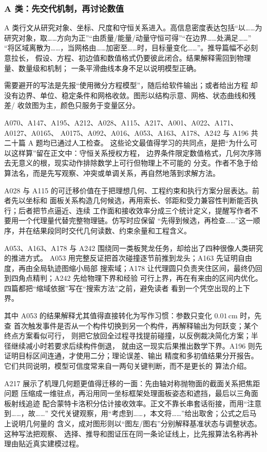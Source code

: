 \subsubsection{A 类：先交代机制，再讨论数值}

A 类行文从研究对象、坐标、尺度和守恒关系进入。高信息密度表达包括“以……为
研究对象，取……方向为正”“由质量/能量/动量守恒可得”“在边界……处满足……”
“将区域离散为……，当网格由……加密至……时，目标量变化……”。推导篇幅不必刻意拉长，
假设、方程、初边值和数值格式仍要彼此闭合。结果解释需回到物理量、数量级和机制；
一条平滑曲线本身不足以说明模型正确。

需要避开的写法是先报“使用微分方程模型”，随后给软件输出；或者给出方程
却没有边界、单位、稳定条件和网格收敛。图形以结构示意、网格、状态曲线和残差/
收敛图为主，颜色只服务于变量区分。

A070、A147、A195、A212、A028、A115、A217、A001、A022、A171、A0127、A0165、
A0175、A092、A016、A053、A163、A178、A242 与 A196 共二十篇 A 题均已通过人工检查。
这些论文最值得学习的共同点，是把“为什么可以这样算”留在正文中：守恒关系授权方程，
边界条件限定数值格式，几何次序筛去无意义的根，现实动作排除数学上可行但物理上不可能的
分支。作者不急于给算法名，而是先写观察、冲突或单调关系，再自然地落到求解方法。

A028 与 A115 的可迁移价值在于把理想几何、工程约束和执行方案分层表达。前者先以坐标和
面板关系构造几何候选，再用索长、邻距和受力兼容性判断能否执行；后者把节点逼近、连续
工作面和接收效率分成三个统计定义，提醒写作者不要用一个代理量代替完整物理链。仿写时应保留
“先得到候选，再检查……”这一顺序，并在结果段同时交代几何读数、约束余量和工程含义。

A053、A163、A178 与 A242 围绕同一类板凳龙任务，却给出了四种很像人类研究的推进方式。
A053 用完整反证把首次碰撞逐节前推到龙头；A163 先证明自由度，再由全局轨迹图缩小局部
搜索域；A178 让代理圆只负责夹住区间，最终仍回到四角点精判；A242 先给物理下界和经验
可行上界，再在有来由的区间内优化。四篇都把“缩域依据”写在“搜索方法”之前，避免读者
看到一个凭空出现的上下界。

其中 A053 的结果解释尤其值得直接转化为写作习惯：参数只变化 $0.01\,\mathrm{cm}$ 时，先查
首次触发事件是否从一个构件切换到另一个构件，再解释输出为何跃变；某个终点方案看似可行，
则把它放回全过程寻找提前碰撞，以反例裁决简化方案；半径继续减小时若要求后续构件倒退，
就由这一现实后果推出数学下界。A196 则先证明目标区间连通，才使用二分；理论误差、输出
精度和多初值结果分开报告。它们共同说明，模型可信度常来自一两句关键判断，而不是更长的
算法介绍。

A217 展示了机理几何题更值得迁移的一面：先由轴对称抛物面的截面关系把焦距问题
压缩成一维驻点，再沿用同一坐标框架处理面板姿态和遮挡，最后以三角面板射线追迹
配合蒙特卡洛积分估计接收效率。正文不靠长串套话衔接，而用“注意到……，故……”
交代关键观察，用“考虑到……，本文将……”给出取舍；公式之后马上说明几何量的
含义，成对图形则以“图左/图右”分别解释基准状态与调整状态。这种写法把观察、
选择、推导和图证压在同一条论证线上，比先报算法名称再补理由贴近真实建模过程。

